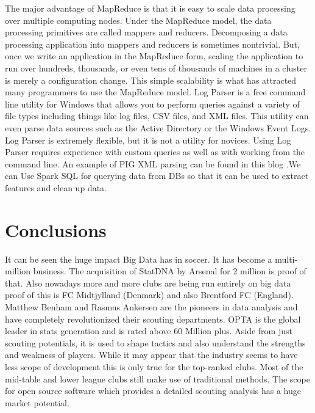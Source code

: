 \documentclass[sigconf]{acmart}
\begin{document}
The major advantage of MapReduce is that it is easy to scale data processing over multiple computing nodes. Under the MapReduce model, the data processing primitives are called mappers and reducers. Decomposing a data processing application into mappers and reducers is sometimes nontrivial. But, once we write an application in the MapReduce form, scaling the application to run over hundreds, thousands, or even tens of thousands of machines in a cluster is merely a configuration change. This simple scalability is what has attracted many programmers to use the MapReduce model.\cite{Tutorialspoint2000}\newline
Log Parser is a free command line utility for Windows that allows you to perform queries against a variety of file types including things like log files, CSV files, and XML files. This utility can even parse data sources such as the Active Directory or the Windows Event Logs.
Log Parser is extremely flexible, but it is not a utility for novices. Using Log Parser requires experience with custom queries as well as with working from the command line.
An example of PIG XML parsing can be found in this blog \cite{learnbigdataanalytics2000}.We can Use Spark SQL for querying data from DBs so that it can be used to extract features and clean up data. 

\section{Conclusions}

It can be seen the huge impact Big Data has in soccer. It has become a multi-million business. The acquisition of StatDNA by Arsenal for 2 million is proof of that. Also nowadays more and more clubs are being run entirely on big data proof of this is FC Midtjylland (Denmark) and also Brentford FC (England). Matthew Benham and Rasmus Ankersen are the pioneers in data analysis and have completely revolutionized their scouting departments. OPTA is the global leader in stats generation and is rated above 60 Million plus. Aside from just scouting potentials, it is used to shape tactics and also understand the strengths and weakness of players. While it may appear that the industry seems to have less scope of development this is only true for the top-ranked clubs. Most of the mid-table and lower league clubs still make use of traditional methods. The scope for open source software which provides a detailed scouting analysis has a huge market potential.


 
\end{document}
